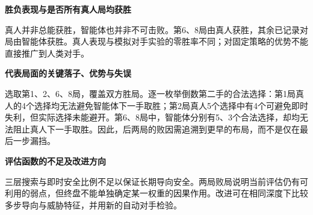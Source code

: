 \noindent\textbf{胜负表现与是否所有真人局均获胜}\par\noindent 真人并非总能获胜，智能体也并非不可击败。第6、8局由真人获胜，其余已记录对局由智能体获胜。真人表现与模拟对手实验的零胜率不同；对固定策略的优势不能直接推广到人类对手。\par\medskip

\noindent\textbf{代表局面的关键落子、优势与失误}\par\noindent 选取第1、2、6、8局，覆盖双方胜局。逐一枚举倒数第二手的合法选择：第1局真人的4个选择均无法避免智能体下一手取胜；第2局真人5个选择中有4个可避免即时失利，但实际选择未能避开。第6、8局中，智能体分别有5、3个合法选择，却均无法阻止真人下一手取胜。因此，后两局的败因需追溯到更早的布局，而不是仅在最后一步漏挡。\par\medskip

\noindent\textbf{评估函数的不足及改进方向}\par\noindent 三层搜索与即时安全比例不足以保证长期导向安全。两局败局说明当前评估仍有可利用的弱点，但终盘不能单独确定某一权重的因果作用。改进可在相同深度下比较多步导向与威胁特征，并用新的自动对手检验。\par\medskip
